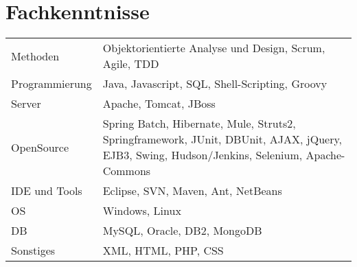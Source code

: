 \section*{Fachkenntnisse}
\begin{tabular}{@{}p{6cm}p{10cm}}
Methoden	& Objektorientierte Analyse und Design, Scrum, Agile, TDD\\
Programmierung	& Java, Javascript, SQL, Shell-Scripting, Groovy\\
Server		& Apache, Tomcat, JBoss\\
OpenSource	& Spring Batch, Hibernate, Mule, Struts2, Springframework, JUnit, DBUnit, AJAX, jQuery, EJB3, Swing, Hudson/Jenkins, Selenium, Apache-Commons\\
IDE und Tools	& Eclipse, SVN, Maven, Ant, NetBeans\\
OS		& Windows, Linux\\
DB		& MySQL, Oracle, DB2, MongoDB\\
Sonstiges	& XML, HTML, PHP, CSS
\end{tabular}
